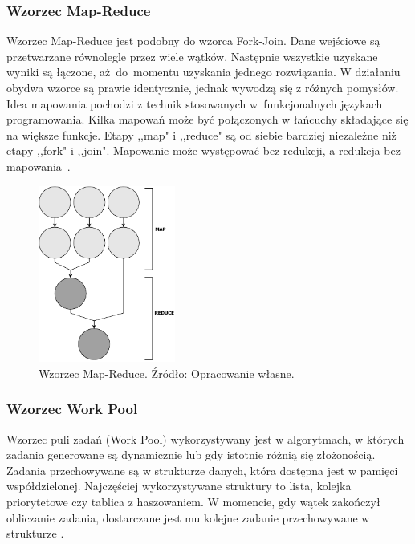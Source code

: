 \documentclass[12pt]{article}
\begin{document}
\subsubsection{Wzorzec Map-Reduce}
Wzorzec Map-Reduce jest podobny do wzorca Fork-Join. Dane wejściowe są przetwarzane równolegle przez wiele wątków.
Następnie wszystkie uzyskane wyniki są łączone, aż~do~momentu uzyskania jednego rozwiązania.
W działaniu obydwa wzorce są prawie identycznie, jednak wywodzą się z różnych pomysłów.
Idea mapowania pochodzi z technik stosowanych w~funkcjonalnych językach programowania.
Kilka mapowań może być połączonych w łańcuchy składające się na większe funkcje.
Etapy ,,map" i ,,reduce" są od siebie bardziej niezależne niż etapy ,,fork" i ,,join".
Mapowanie może występować bez redukcji, a redukcja bez mapowania~\cite{parallel-design-patterns}.

\begin{figure}[H]
    \centering
	\includegraphics[width=0.4\textwidth]{patterns-map-reduce.pdf}
    \caption{Wzorzec Map-Reduce. Źródło: Opracowanie własne.}
    \label{fig:map-reduce}
\end{figure}

\subsubsection{Wzorzec Work Pool}\label{work-pool}
Wzorzec puli zadań (Work Pool) wykorzystywany jest w algorytmach, w których zadania generowane są dynamicznie
lub gdy istotnie różnią się złożonością. Zadania przechowywane są w strukturze danych, która dostępna
jest w pamięci współdzielonej. Najczęściej wykorzystywane struktury to lista, kolejka priorytetowe
czy tablica z haszowaniem. W momencie, gdy wątek zakończył obliczanie zadania, dostarczane jest mu
kolejne zadanie przechowywane w strukturze \cite{wprowadzenie-do-obliczen-rownoleglych}.
\end{document}
